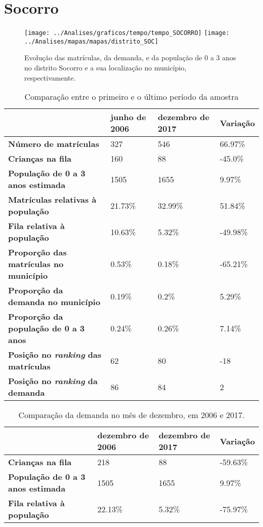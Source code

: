 \section{Socorro}
\begin{figure}[H]
	\centering
	\texttt{[image: ../Analises/graficos/tempo/tempo\_SOCORRO]}
	\texttt{[image: ../Analises/mapas/mapas/distrito\_SOC]}
	\caption{Evolução das matrículas, da demanda, e da população de 0 a 3 anos no distrito Socorro e a sua localização no município, respectivamente.}
\end{figure}
\begin{table}[H]
	\begin{tabular}{|l|l|l|l|}
		\hline
		\textbf{}                                      & \textbf{junho de 2006}       & \textbf{dezembro de 2017}    & \textbf{Variação} \\ \hline
		\textbf{Número de matrículas}                  & 327 & 546 & 66.97\% \\ \hline
		\textbf{Crianças na fila}                      & 160 & 88 & -45.0\% \\ \hline
		\textbf{População de 0 a 3 anos estimada}      & 1505 & 1655 & 9.97\% \\ \hline
		\textbf{Matrículas relativas à população}      & 21.73\% & 32.99\% & 51.84\% \\ \hline
		\textbf{Fila relativa à população}             & 10.63\% & 5.32\% & -49.98\% \\ \hline
		\textbf{Proporção das matrículas no município} & 0.53\% & 0.18\% & -65.21\% \\ \hline
		\textbf{Proporção da demanda no município}     & 0.19\% & 0.2\% & 5.29\% \\ \hline
		\textbf{Proporção da população de 0 a 3 anos}  & 0.24\% & 0.26\% & 7.14\% \\ \hline
		\textbf{Posição no \textit{ranking} das matrículas}     & 62 & 80 & -18 \\ \hline
		\textbf{Posição no \textit{ranking} da demanda}         & 86 & 84 & 2 \\ \hline
	\end{tabular}
	\caption{Comparação entre o primeiro e o último período da amostra}
\end{table}
\begin{table}[H]
	\begin{tabular}{|l|l|l|l|}
		\hline
		\textbf{}                                 & \textbf{dezembro de 2006} & \textbf{dezembro de 2017} & \textbf{Variação} \\ \hline
		\textbf{Crianças na fila}                      & 218 & 88 & -59.63\% \\ \hline
		\textbf{População de 0 a 3 anos estimada}      & 1505 & 1655 & 9.97\% \\ \hline
		\textbf{Fila relativa à população}             & 22.13\% & 5.32\% & -75.97\% \\ \hline
	\end{tabular}
	\caption{Comparação da demanda no mês de dezembro, em 2006 e 2017.}
\end{table}
